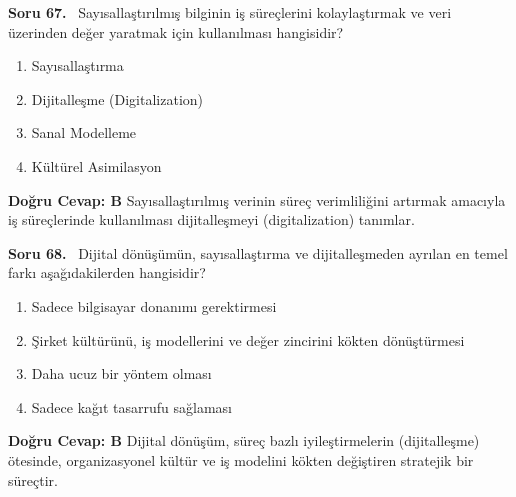 \documentclass[11pt,a4paper,openany]{book}
\begin{document}
\needspace{5cm}
\vspace{8pt}
\noindent\textbf{\large\sffamily Soru 67.} \ Sayısallaştırılmış bilginin iş süreçlerini kolaylaştırmak ve veri üzerinden değer yaratmak için kullanılması hangisidir?
\begin{enumerate}[label=\Alph*), leftmargin=25pt, topsep=4pt, itemsep=2pt]
    \item Sayısallaştırma
    \item Dijitalleşme (Digitalization)
    \item Sanal Modelleme
    \item Kültürel Asimilasyon
\end{enumerate}
\vspace{4pt}
\begin{tcolorbox}[title=Cevap ve Açıklama, colback=gray!3!white, colframe=primarycolor!90!black, arc=2mm, fonttitle=\bfseries\sffamily, top=6pt, bottom=6pt]
    \textbf{Doğru Cevap: B}
    \vspace{2pt}
    Sayısallaştırılmış verinin süreç verimliliğini artırmak amacıyla iş süreçlerinde kullanılması dijitalleşmeyi (digitalization) tanımlar.
\end{tcolorbox}
\vspace{10pt}

\needspace{5cm}
\vspace{8pt}
\noindent\textbf{\large\sffamily Soru 68.} \ Dijital dönüşümün, sayısallaştırma ve dijitalleşmeden ayrılan en temel farkı aşağıdakilerden hangisidir?
\begin{enumerate}[label=\Alph*), leftmargin=25pt, topsep=4pt, itemsep=2pt]
    \item Sadece bilgisayar donanımı gerektirmesi
    \item Şirket kültürünü, iş modellerini ve değer zincirini kökten dönüştürmesi
    \item Daha ucuz bir yöntem olması
    \item Sadece kağıt tasarrufu sağlaması
\end{enumerate}
\vspace{4pt}
\begin{tcolorbox}[title=Cevap ve Açıklama, colback=gray!3!white, colframe=primarycolor!90!black, arc=2mm, fonttitle=\bfseries\sffamily, top=6pt, bottom=6pt]
    \textbf{Doğru Cevap: B}
    \vspace{2pt}
    Dijital dönüşüm, süreç bazlı iyileştirmelerin (dijitalleşme) ötesinde, organizasyonel kültür ve iş modelini kökten değiştiren stratejik bir süreçtir.
\end{tcolorbox}
\vspace{10pt}
\end{document}
